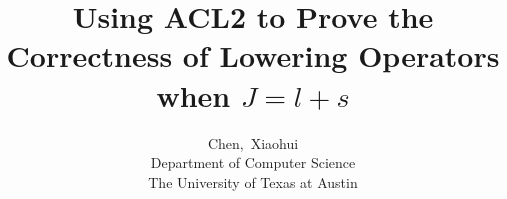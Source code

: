 \documentclass[12pt,journal,compsoc]{IEEEtran}
\begin{document}
%
\title{Using ACL2 to Prove the Correctness of Lowering Operators when $J=l+s$}
%
%
%
%

\author{Chen,~Xiaohui\\
	Department of Computer Science\\
	The University of Texas at Austin%
	}

% 
%
\end{document}

